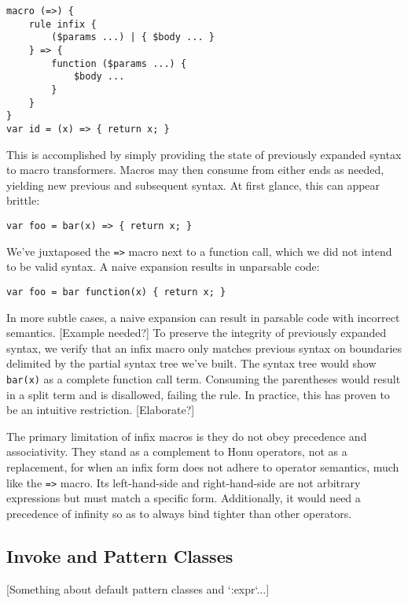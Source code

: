 \documentclass[preprint,10pt]{sigplanconf}
\begin{document}
\begin{verbatim}
macro (=>) {
    rule infix {
        ($params ...) | { $body ... }
    } => {
        function ($params ...) {
            $body ...
        }
    }
}
var id = (x) => { return x; }
\end{verbatim}

This is accomplished by simply providing the state of previously
expanded syntax to macro transformers. Macros may then consume from
either ends as needed, yielding new previous and subsequent syntax. At
first glance, this can appear brittle:

\begin{verbatim}
var foo = bar(x) => { return x; }
\end{verbatim}

We've juxtaposed the \verb!=>! macro next to a function call, which we did
not intend to be valid syntax. A naive expansion results in unparsable
code:

\begin{verbatim}
var foo = bar function(x) { return x; }
\end{verbatim}

In more subtle cases, a naive expansion can result in parsable code
with incorrect semantics. [Example needed?] To preserve the integrity
of previously expanded syntax, we verify that an infix macro only
matches previous syntax on boundaries delimited by the partial syntax
tree we've built. The syntax tree would show \verb!bar(x)! as a complete
function call term. Consuming the parentheses would result in a split
term and is disallowed, failing the rule. In practice, this has proven
to be an intuitive restriction. [Elaborate?]

The primary limitation of infix macros is they do not obey precedence
and associativity. They stand as a complement to Honu operators, not
as a replacement, for when an infix form does not adhere to operator
semantics, much like the \verb!=>! macro. Its left-hand-side and
right-hand-side are not arbitrary expressions but must match a
specific form. Additionally, it would need a precedence of infinity so
as to always bind tighter than other operators.

\subsection{Invoke and Pattern Classes}
\label{sec-4-2}

[Something about default pattern classes and `:expr`...]
\end{document}
